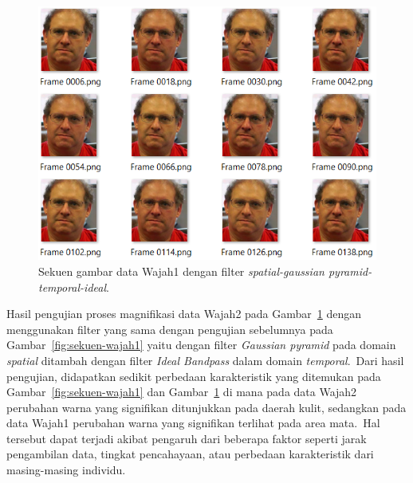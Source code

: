 \begin{figure}[ht]
	\vspace{0.5em}
	\centering
	\includegraphics[width=\textwidth,height=0.4\linewidth]{data-wajah2}
	\caption{Sekuen gambar data Wajah1 dengan filter \textit{spatial-gaussian pyramid-temporal-ideal}.}
	\label{fig:sekuen-wajah2}   
\end{figure}
Hasil pengujian proses magnifikasi data Wajah2 pada Gambar~\ref{fig:sekuen-wajah2} dengan menggunakan filter yang sama dengan pengujian sebelumnya pada Gambar~\ref{fig:sekuen-wajah1} yaitu dengan filter \textit{Gaussian pyramid} pada domain \textit{spatial} ditambah dengan filter \textit{Ideal Bandpass} dalam domain \textit{temporal}.~Dari hasil pengujian, didapatkan sedikit perbedaan karakteristik yang ditemukan pada Gambar~\ref{fig:sekuen-wajah1} dan Gambar~\ref{fig:sekuen-wajah2} di mana pada data Wajah2 perubahan warna yang signifikan ditunjukkan pada daerah kulit, sedangkan pada data Wajah1 perubahan warna yang signifikan terlihat pada area mata.~Hal tersebut dapat terjadi akibat pengaruh dari beberapa faktor seperti jarak pengambilan data, tingkat pencahayaan, atau perbedaan karakteristik dari masing-masing individu.


